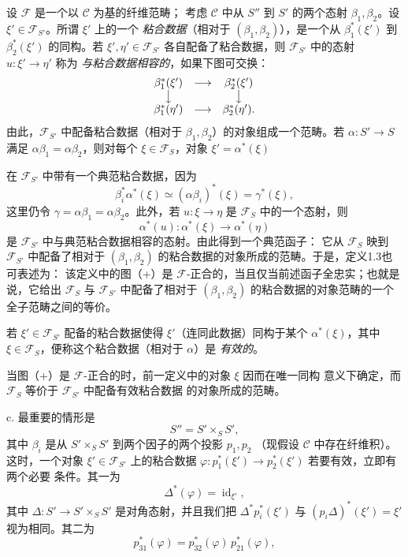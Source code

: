  设 $\mathcal F$ 是一个以 $\mathcal C$ 为基的纤维范畴；
考虑 $\mathcal C$ 中从 $S''$ 到 $S'$ 的两个态射
$\beta_1,\beta_2$。设 $\xi'\in\mathcal F_{S'}$。所谓 $\xi'$ 上的一个
\emph{粘合数据}（相对于 $(\beta_1,\beta_2)$），是一个从
$\beta_1^*(\xi')$ 到 $\beta_2^*(\xi')$ 的同构。若
$\xi',\eta'\in\mathcal F_{S'}$ 各自配备了粘合数据，则
$\mathcal F_{S'}$ 中的态射 $u:\xi'\longrightarrow\eta'$ 称为
\emph{与粘合数据相容的}，如果下图可交换：
\[
\begin{array}{ccc}
  \beta_1^*(\xi') & \longrightarrow & \beta_2^*(\xi') \\
  \big\downarrow && \big\downarrow \\
  \beta_1^*(\eta') & \longrightarrow & \beta_2^*(\eta').
\end{array}
\]
由此，$\mathcal F_{S'}$ 中配备粘合数据（相对于
$\beta_1,\beta_2$）的对象组成一个范畴。若
$\alpha:S'\longrightarrow S$ 满足
$\alpha\beta_1=\alpha\beta_2$，则对每个 $\xi\in\mathcal F_S$，对象
$\xi'=\alpha^*(\xi)$

在 $\mathcal F_{S'}$ 中带有一个典范粘合数据，因为
\[
  \beta_i^*\alpha^*(\xi)\simeq(\alpha\beta_i)^*(\xi)=\gamma^*(\xi),
\]
这里仍令 $\gamma=\alpha\beta_1=\alpha\beta_2$。此外，若
$u:\xi\longrightarrow\eta$ 是 $\mathcal F_S$ 中的一个态射，则
\[
  \alpha^*(u):\alpha^*(\xi)\longrightarrow\alpha^*(\eta)
\]
是 $\mathcal F_{S'}$ 中与典范粘合数据相容的态射。由此得到一个典范函子：
它从 $\mathcal F_S$ 映到 $\mathcal F_{S'}$ 中配备了相对于
$(\beta_1,\beta_2)$ 的粘合数据的对象所成的范畴。于是，定义1.3也可表述为：
该定义中的图（+）是 $\mathcal F$-正合的，当且仅当前述函子全忠实；也就是
说，它给出 $\mathcal F_S$ 与 $\mathcal F_{S'}$ 中配备了相对于
$(\beta_1,\beta_2)$ 的粘合数据的对象范畴的一个全子范畴之间的等价。

 若 $\xi'\in\mathcal F_{S'}$ 配备的粘合数据使得
$\xi'$（连同此数据）同构于某个 $\alpha^*(\xi)$，其中
$\xi\in\mathcal F_S$，便称这个粘合数据（相对于 $\alpha$）是
\emph{有效的}。

当图（+）是 $\mathcal F$-正合的时，前一定义中的对象 $\xi$ 因而在唯一同构
意义下确定，而 $\mathcal F_S$ 等价于 $\mathcal F_{S'}$ 中配备有效粘合数据
的对象所成的范畴。

\medskip\noindent
c. 最重要的情形是
\[
  S''=S'\times_S S',
\]
其中 $\beta_i$ 是从 $S'\times_S S'$ 到两个因子的两个投影 $p_1,p_2$
（现假设 $\mathcal C$ 中存在纤维积）。这时，一个对象
$\xi'\in\mathcal F_{S'}$ 上的粘合数据
$\varphi:p_1^*(\xi')\longrightarrow p_2^*(\xi')$ 若要有效，立即有两个必要
条件。其一为
\[
  \tag{i}
  \Delta^*(\varphi)=\operatorname{id}_{\xi'},
\]
其中 $\Delta:S'\longrightarrow S'\times_S S'$ 是对角态射，并且我们把
$\Delta^*p_i^*(\xi')$ 与 $(p_i\Delta)^*(\xi')=\xi'$ 视为相同。其二为
\[
  \tag{ii}
  p_{31}^*(\varphi)=p_{32}^*(\varphi)\,p_{21}^*(\varphi),
\]

